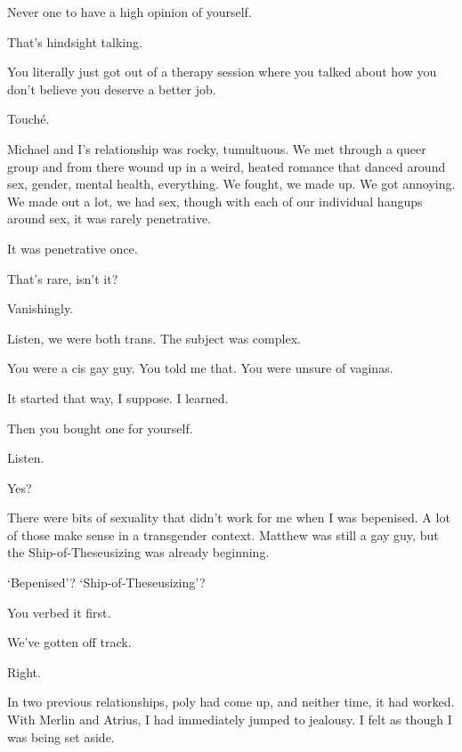\begin{paracol}{2}
\begin{leftcolumn}
\begin{ally}
Never one to have a high opinion of yourself.
\end{ally}
That's hindsight talking.

\begin{ally}
You literally just got out of a therapy session where you talked about how you don't believe you deserve a better job.
\end{ally}
Touché.

Michael and I's relationship was rocky, tumultuous. We met through a queer group and from there wound up in a weird, heated romance that danced around sex, gender, mental health, everything. We fought, we made up. We got annoying. We made out a lot, we had sex, though with each of our individual hangups around sex, it was rarely penetrative.

\begin{ally}
It was penetrative once.
\end{ally}
That's rare, isn't it?

\begin{ally}
Vanishingly.
\end{ally}
Listen, we were both trans. The subject was complex.

\begin{ally}
You were a cis gay guy. You told me that. You were unsure of vaginas.
\end{ally}
It started that way, I suppose. I learned.

\begin{ally}
Then you bought one for yourself.
\end{ally}
Listen.

\begin{ally}
Yes?
\end{ally}
There were bits of sexuality that didn't work for me when I was bepenised. A lot of those make sense in a transgender context. Matthew was still a gay guy, but the Ship-of-Theseusizing was already beginning.

\begin{ally}
`Bepenised'? `Ship-of-Theseusizing'?
\end{ally}
You verbed it first.

\begin{ally}
We've gotten off track.
\end{ally}
Right.

In two previous relationships, poly had come up, and neither time, it had worked. With Merlin and Atrius, I had immediately jumped to jealousy. I felt as though I was being set aside.


\end{leftcolumn}
\end{paracol}
